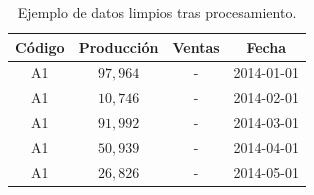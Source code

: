 \documentclass[paper=leter, fontsize=11pt]{scrartcl}
\numberwithin{equation}{section}		%
\numberwithin{figure}{section}			%
\numberwithin{table}{section}				%
\begin{document}
\begin{table}[]
	\caption{Ejemplo de datos limpios tras procesamiento.}
	\label{limpios}
	\centering
	\begin{tabular}{c|c|c|c}
    Código & Producción & Ventas & Fecha \\ \hline
    A1 & $97,964$ & - & 2014-01-01 \\
    A1 & $10,746$ & - & 2014-02-01 \\
    A1 & $91,992$ & - & 2014-03-01 \\
    A1 & $50,939$ & - & 2014-04-01 \\
    A1 & $26,826$ & - & 2014-05-01
	\end{tabular}
\end{table}

\raggedright 


\end{document}
